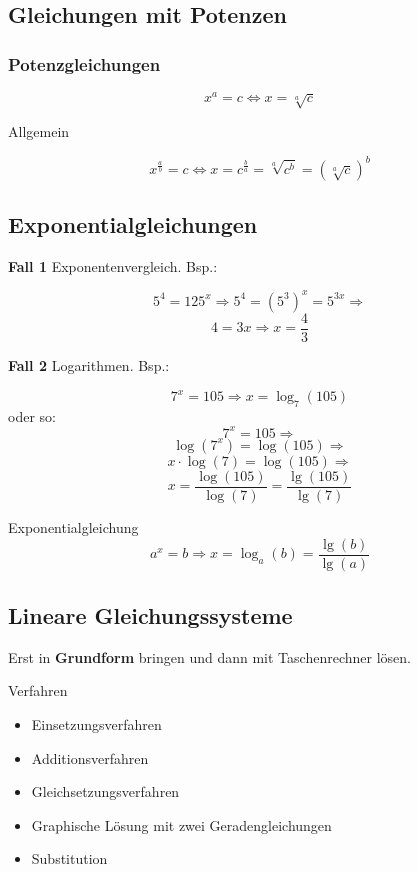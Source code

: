 \begin{multicols}{2}


\subsection{Gleichungen mit Potenzen}
\subsubsection{Potenzgleichungen}

$$x^a=c \Leftrightarrow x=\sqrt[a]{c}$$

Allgemein

$$x^{\frac{a}b} = c \Leftrightarrow{}
x=c^{\frac{b}a} = \sqrt[a]{c^b} = \left(\sqrt[a]c\right)^b$$

\subsection{Exponentialgleichungen}
\textbf{Fall 1} Exponentenvergleich. Bsp.:

$$5^4=125^x \Rightarrow{} 5^4=(5^3)^x=5^{3x} \Rightarrow{}$$
$$ 4=3x \Rightarrow x=\frac43$$

\textbf{Fall 2} Logarithmen. Bsp.:

$$7^x=105 \Rightarrow x=\log_7(105)$$
oder so:
$$7^x=105 \Rightarrow$$
$$ \log(7^x)=\log(105) \Rightarrow$$
$$x\cdot{}\log(7)=\log(105) \Rightarrow$$
$$ x=\frac{\log(105)}{\log(7)} = \frac{\lg(105)}{\lg(7)}$$

\begin{gesetz}{Exponentialgleichung}{}
$$a^x=b \Rightarrow{} x=\log_a(b) = \frac{\lg(b)}{\lg(a)}$$
\end{gesetz}



  
\newpage


\subsection{Lineare Gleichungssysteme}
Erst in \textbf{Grundform} bringen und dann
mit Taschenrechner  lösen.

Verfahren
\begin{itemize}
\item Einsetzungsverfahren
\item Additionsverfahren
\item Gleichsetzungsverfahren
\item Graphische Lösung mit zwei Geradengleichungen
\item Substitution
\end{itemize}


\end{multicols}
